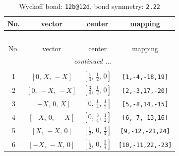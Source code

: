 \documentclass[fleqn,8pt]{jsarticle}
\begin{document}
\renewcommand{\arraystretch}{1.2}
\begin{longtable}{cccc}
\caption{Wyckoff bond: {\tt 12b@12d}, bond symmetry: {\tt 2.22}}
 \\
 \hline \hline
No. & vector & center & mapping \\ \hline \endfirsthead

\multicolumn{3}{l}{\tablename\ \thetable{}} \\
 \hline \hline
No. & vector & center & mapping \\ \hline \endhead

 \hline \hline
\multicolumn{3}{r}{\footnotesize\it continued ...} \\ \endfoot

 \hline \hline
\multicolumn{3}{r}{} \\ \endlastfoot

1 & $\left[ 0,\, X,\, - X \right]$ & $\left[ \frac{1}{4},\, \frac{1}{2},\, 0 \right]$ & {\tt [1,-4,-18,19]} \\ \hline
2 & $\left[ 0,\, - X,\, - X \right]$ & $\left[ \frac{3}{4},\, \frac{1}{2},\, 0 \right]$ & {\tt [2,-3,17,-20]} \\ \hline
3 & $\left[ - X,\, 0,\, X \right]$ & $\left[ 0,\, \frac{1}{4},\, \frac{1}{2} \right]$ & {\tt [5,-8,14,-15]} \\ \hline
4 & $\left[ - X,\, 0,\, - X \right]$ & $\left[ 0,\, \frac{3}{4},\, \frac{1}{2} \right]$ & {\tt [6,-7,-13,16]} \\ \hline
5 & $\left[ X,\, - X,\, 0 \right]$ & $\left[ \frac{1}{2},\, 0,\, \frac{1}{4} \right]$ & {\tt [9,-12,-21,24]} \\ \hline
6 & $\left[ - X,\, - X,\, 0 \right]$ & $\left[ \frac{1}{2},\, 0,\, \frac{3}{4} \right]$ & {\tt [10,-11,22,-23]} \\
\end{longtable}
\renewcommand{\arraystretch}{1.2}
\end{document}
